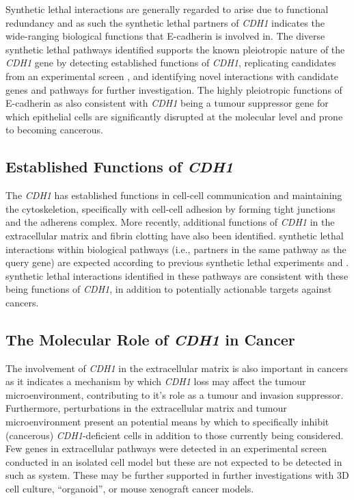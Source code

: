 Synthetic lethal interactions are generally regarded to arise due to \gls{functional redundancy} \citep{Boone2007, Kaelin2005, Fece2015} and as such the \gls{synthetic lethal} partners of \textit{CDH1} indicates the wide-ranging biological functions that \gls{E-cadherin} is involved in. The diverse \gls{synthetic lethal} pathways identified supports the known pleiotropic nature of the \textit{CDH1} gene by detecting established functions of \textit{CDH1}, replicating candidates from an experimental screen \citep{Telford2015}, and identifying novel interactions with candidate genes and pathways for further investigation. The highly pleiotropic functions of \gls{E-cadherin} as also consistent with \textit{CDH1} being a \gls{tumour suppressor} gene for which epithelial cells are significantly disrupted at the molecular level and prone to becoming cancerous.

\subsection{Established Functions of \textit{CDH1}}
\label{chapt6:function}

The \textit{CDH1} has established functions in cell-cell communication and maintaining the cytoskeletion, specifically with cell-cell adhesion by forming tight junctions and the adherens complex. More recently, additional functions of \textit{CDH1} in the extracellular matrix and fibrin clotting have also been identified. \Gls{synthetic lethal} interactions within biological pathways (i.e., partners in the same pathway as the query gene) are expected according to previous \gls{synthetic lethal} experiments and  \citep{Kelley2005, Boone2007}. \Gls{synthetic lethal} interactions identified in these pathways are consistent with these being functions of \textit{CDH1}, in addition to potentially actionable targets against cancers.


\subsection{The Molecular Role of \textit{CDH1} in Cancer}
\label{chapt6:cancer}

The involvement of \textit{CDH1} in the extracellular matrix is also important in cancers as it indicates a mechanism by which \textit{CDH1} loss may affect the tumour microenvironment, contributing to it's role as a tumour and invasion suppressor. Furthermore, perturbations in the extracellular matrix and tumour microenvironment present an potential means by which to specifically inhibit (cancerous) \textit{CDH1}-deficient cells in addition to those currently being considered. Few genes in extracellular pathways were detected in an experimental screen \citep{Telford2015} conducted in an isolated cell model \citep{Chen2014} but these are not expected to be detected in such as system. These may be further supported in further investigations with 3D cell culture, ``organoid'', or mouse xenograft cancer models.

